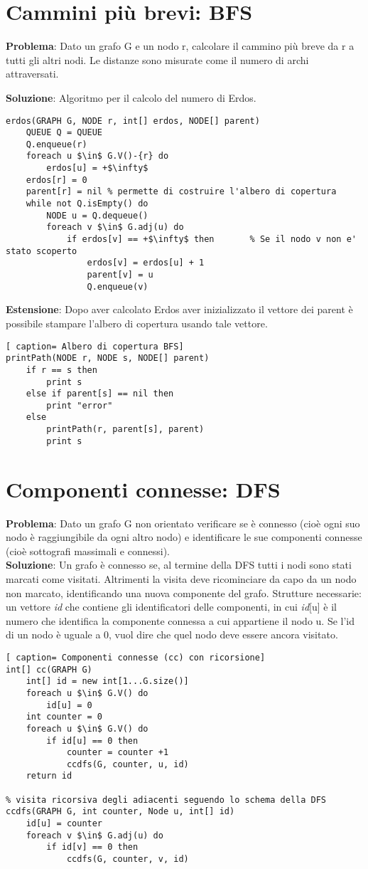 \documentclass[../cheatSheetAlgoritmi.tex]{subfiles}
\begin{document}
\section{Cammini più brevi: BFS}
\textbf{Problema}: Dato un grafo G e un nodo r, calcolare il cammino più breve da r a tutti gli altri nodi. Le distanze sono misurate come il numero di archi attraversati.

\textbf{Soluzione}: Algoritmo per il calcolo del numero di Erdos.

\begin{lstlisting}[caption= Erdos]
erdos(GRAPH G, NODE r, int[] erdos, NODE[] parent)
	QUEUE Q = QUEUE
	Q.enqueue(r)
	foreach u $\in$ G.V()-{r} do
		erdos[u] = +$\infty$
	erdos[r] = 0
	parent[r] = nil % permette di costruire l'albero di copertura
	while not Q.isEmpty() do
		NODE u = Q.dequeue()
		foreach v $\in$ G.adj(u) do
			if erdos[v] == +$\infty$ then		% Se il nodo v non e' stato scoperto
				erdos[v] = erdos[u] + 1
				parent[v] = u
				Q.enqueue(v)
\end{lstlisting}
\textbf{Estensione}: Dopo aver calcolato Erdos aver inizializzato il vettore dei parent è possibile stampare l'albero di copertura usando tale vettore.\
\begin{lstlisting}[ caption= Albero di copertura BFS]
printPath(NODE r, NODE s, NODE[] parent)
	if r == s then
		print s
	else if parent[s] == nil then
		print "error"
	else
		printPath(r, parent[s], parent)
		print s
\end{lstlisting}
\section{Componenti connesse: DFS}
\textbf{Problema}: Dato un grafo G non orientato verificare se è connesso (cioè  ogni suo nodo è raggiungibile da ogni altro nodo) e identificare le sue componenti connesse (cioè sottografi massimali e connessi).\\
\textbf{Soluzione}: Un grafo è connesso se, al termine della DFS tutti i nodi sono stati marcati come visitati. Altrimenti la visita deve ricominciare da capo da un nodo non marcato, identificando una nuova componente del grafo. Strutture necessarie: un vettore \textit{id} che contiene gli identificatori delle componenti, in cui \textit{id}[u] è il numero che identifica la componente connessa a cui appartiene il nodo u. Se l'id di un nodo è uguale a 0, vuol dire che quel nodo deve essere ancora visitato.\
 
\begin{lstlisting}[ caption= Componenti connesse (cc) con ricorsione]
int[] cc(GRAPH G)
	int[] id = new int[1...G.size()]
	foreach u $\in$ G.V() do
		id[u] = 0
	int counter = 0
	foreach u $\in$ G.V() do
		if id[u] == 0 then
			counter = counter +1
			ccdfs(G, counter, u, id)
	return id

% visita ricorsiva degli adiacenti seguendo lo schema della DFS	
ccdfs(GRAPH G, int counter, Node u, int[] id)
	id[u] = counter
	foreach v $\in$ G.adj(u) do
		if id[v] == 0 then
			ccdfs(G, counter, v, id)
\end{lstlisting}
\end{document}
